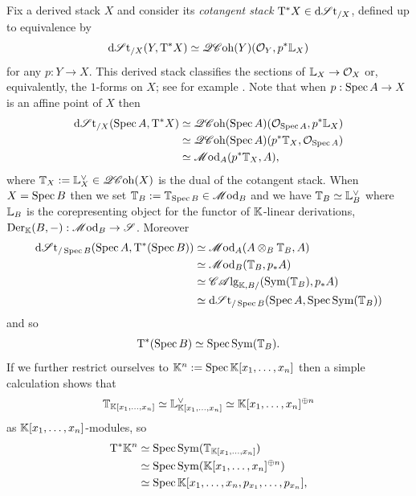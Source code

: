 Fix a derived stack $X$ and consider its \emph{cotangent stack} $\mathrm{T}^\ast X \in \mathrm{d}\mathscr{S}\mathrm{t}_{/X}$, defined up to equivalence by
\begin{equation*}
	\mathrm{d}\mathscr{S}\mathrm{t}_{/X}(Y, \mathrm{T}^\ast X) \simeq \mathscr{QC}\mathrm{oh}(Y)(\mathcal{O}_Y, p^\ast \mathbb{L}_X)
\end{equation*}
for any $p : Y \to X$. This derived stack classifies the sections of $\mathbb{L}_X \to \mathcal{O}_X$ or, equivalently, the $1$-forms on $X$; see for example \cite[beginning of Section 2]{Calaque2019}. Note that when $p : \operatorname{Spec} A \to X$ is an affine point of $X$ then
\begin{align*}
	\mathrm{d}\mathscr{S}\mathrm{t}_{/X}(\operatorname{Spec} A, \mathrm{T}^\ast X) & \simeq \mathscr{QC}\mathrm{oh}(\operatorname{Spec} A)(\mathcal{O}_{\operatorname{Spec} A}, p^\ast \mathbb{L}_X) \\
	& \simeq \mathscr{QC}\mathrm{oh}(\operatorname{Spec} A)(p^\ast \mathbb{T}_X, \mathcal{O}_{\operatorname{Spec} A}) \\
	& \simeq \mathscr{M}\mathrm{od}_A(p^\ast \mathbb{T}_X, A),
\end{align*}
where $\mathbb{T}_X := \mathbb{L}_X^\vee \in \mathscr{QC}\mathrm{oh}(X)$ is the dual of the cotangent stack. When $X = \operatorname{Spec} B$ then we set $\mathbb{T}_B := \mathbb{T}_{\operatorname{Spec} B} \in \mathscr{M}\mathrm{od}_B$ and we have $\mathbb{T}_B \simeq \mathbb{L}_B^\vee$ where $\mathbb{L}_B$ is the corepresenting object for the functor of $\mathbb{K}$-linear derivations, $\mathrm{Der}_{\mathbb{K}}(B, -) : \mathscr{M}\mathrm{od}_B \to \mathscr{S}$. Moreover
\begin{align*}
	\mathrm{d}\mathscr{S}\mathrm{t}_{/\operatorname{Spec} B}(\operatorname{Spec} A, \mathrm{T}^\ast (\operatorname{Spec} B)) & \simeq \mathscr{M}\mathrm{od}_A(A \otimes_B \mathbb{T}_B, A) \\
	& \simeq \mathscr{M}\mathrm{od}_B(\mathbb{T}_B, p_\ast A) \\
	& \simeq \mathscr{CA}\mathrm{lg}_{\mathbb{K}, B/}(\mathrm{Sym}(\mathbb{T}_B), p_\ast A) \\
	& \simeq \mathrm{d}\mathscr{S}\mathrm{t}_{/\operatorname{Spec} B} (\operatorname{Spec} A, \operatorname{Spec} \mathrm{Sym}(\mathbb{T}_B))
\end{align*}
and so
\begin{equation*}
	\mathrm{T}^\ast (\operatorname{Spec} B) \simeq \operatorname{Spec} \mathrm{Sym}(\mathbb{T}_B).
\end{equation*}
If we further restrict ourselves to $\mathbb{K}^n := \operatorname{Spec} \mathbb{K}[x_1, \dotsc, x_n]$ then a simple calculation shows that
\begin{equation*}
	\mathbb{T}_{\mathbb{K}[x_1, \dotsc, x_n]} \simeq \mathbb{L}_{\mathbb{K}[x_1, \dotsc, x_n]}^\vee \simeq \mathbb{K}[x_1, \dotsc, x_n]^{\oplus n}
\end{equation*}
as $\mathbb{K}[x_1, \dotsc, x_n]$-modules, so
\begin{align*}
	\mathrm{T}^\ast \mathbb{K}^n & \simeq \operatorname{Spec} \mathrm{Sym}(\mathbb{T}_{\mathbb{K}[x_1, \dotsc, x_n]}) \\
	& \simeq \operatorname{Spec} \mathrm{Sym}(\mathbb{K}[x_1, \dotsc, x_n]^{\oplus n}) \\
	& \simeq \operatorname{Spec} \mathbb{K}[x_1, \dotsc, x_n, p_{x_1}, \dotsc, p_{x_n}],
\end{align*}
